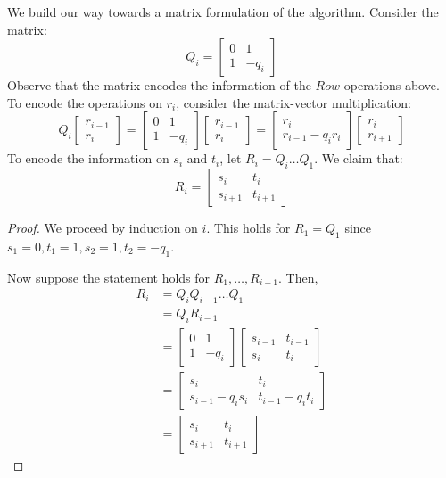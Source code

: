 We build our way towards a matrix formulation of the algorithm.
Consider the matrix:
\[
    Q_i = 
    \begin{bmatrix}
        0 & 1 \\
        1 & -q_i
    \end{bmatrix}
\]
Observe that the matrix encodes the information of the $Row$ operations above.
To encode the operations on $r_i$, consider the matrix-vector multiplication:
\[
    Q_i
    \begin{bmatrix}
        r_{i - 1} \\ r_i
    \end{bmatrix}
    =
    \begin{bmatrix}
        0 & 1 \\
        1 & -q_i
    \end{bmatrix}
    \begin{bmatrix}
        r_{i - 1} \\ r_i
    \end{bmatrix}
    =
    \begin{bmatrix}
        r_i \\ r_{i-1} - q_ir_i
    \end{bmatrix}
    \begin{bmatrix}
        r_i \\ r_{i+1}
    \end{bmatrix}
\]
To encode the information on $s_i$ and $t_i$, let $R_i = Q_i \ldots Q_1$.
We claim that:
\[
    R_i =
    \begin{bmatrix}
        s_i & t_i \\
        s_{i+1} & t_{i+1}
    \end{bmatrix}
\]
\begin{proof}
    We proceed by induction on $i$.
    This holds for $R_1 = Q_1$ since $s_1 = 0, t_1 = 1, s_2 = 1, t_2 = -q_1$.
    
    Now suppose the statement holds for $R_1, \ldots, R_{i-1}$. Then,
    \begin{align*}
        R_i 
        &= Q_iQ_{i-1}\ldots Q_1 \\
        &= Q_i R_{i-1} \\
        &=
        \begin{bmatrix}
            0 & 1 \\
            1 & -q_i
        \end{bmatrix}
        \begin{bmatrix}
            s_{i-1} & t_{i-1} \\
            s_i & t_i
        \end{bmatrix} \\
        &=
        \begin{bmatrix}
            s_i & t_i \\
            s_{i-1} - q_is_i & t_{i-1} - q_it_i
        \end{bmatrix} \\
        &=
        \begin{bmatrix}
            s_i & t_i \\
            s_{i+1} & t_{i+1}
        \end{bmatrix}
    \end{align*}
\end{proof}

